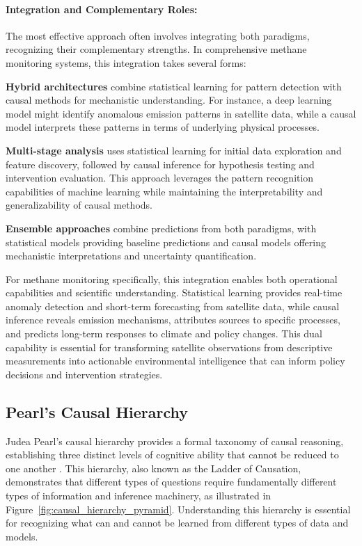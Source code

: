 \paragraph{Integration and Complementary Roles:}

The most effective approach often involves integrating both paradigms, recognizing their complementary strengths. In comprehensive methane monitoring systems, this integration takes several forms:

\textbf{Hybrid architectures} combine statistical learning for pattern detection with causal methods for mechanistic understanding. For instance, a deep learning model might identify anomalous emission patterns in satellite data, while a causal model interprets these patterns in terms of underlying physical processes.

\textbf{Multi-stage analysis} uses statistical learning for initial data exploration and feature discovery, followed by causal inference for hypothesis testing and intervention evaluation. This approach leverages the pattern recognition capabilities of machine learning while maintaining the interpretability and generalizability of causal methods.

\textbf{Ensemble approaches} combine predictions from both paradigms, with statistical models providing baseline predictions and causal models offering mechanistic interpretations and uncertainty quantification.

For methane monitoring specifically, this integration enables both operational capabilities and scientific understanding. Statistical learning provides real-time anomaly detection and short-term forecasting from satellite data, while causal inference reveals emission mechanisms, attributes sources to specific processes, and predicts long-term responses to climate and policy changes. This dual capability is essential for transforming satellite observations from descriptive measurements into actionable environmental intelligence that can inform policy decisions and intervention strategies.

\subsection{Pearl's Causal Hierarchy}

Judea Pearl's causal hierarchy provides a formal taxonomy of causal reasoning, establishing three distinct levels of cognitive ability that cannot be reduced to one another \cite{Pearl2009}. This hierarchy, also known as the Ladder of Causation, demonstrates that different types of questions require fundamentally different types of information and inference machinery, as illustrated in Figure~\ref{fig:causal_hierarchy_pyramid}. Understanding this hierarchy is essential for recognizing what can and cannot be learned from different types of data and models.

